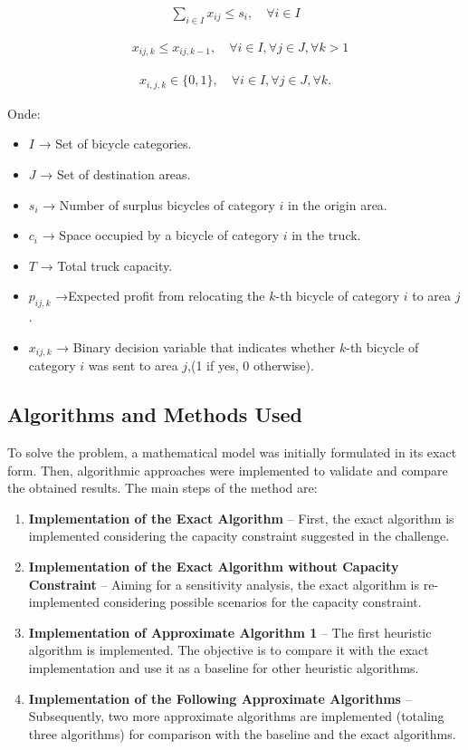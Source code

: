 \documentclass[]{article}
\begin{document}
\begin{align}
	\sum_{i \in I} x_{ij} \leq s_i, \quad \forall i \in I
\end{align}

\begin{align}
    & x_{ij,k} \leq x_{ij,k-1}, \quad \forall i \in I, \forall j \in J, \forall k > 1
\end{align}

\begin{align}
	x_{i,j,k} \in \{0, 1\}, \quad \forall i \in I, \forall j \in J, \forall k.
\end{align}

Onde:

\begin{itemize}
	\item $I$ → Set of bicycle categories.
	\item $J$ → Set of destination areas.
	\item $s_i$ → Number of surplus bicycles of category $i$ in the origin area.
	\item $c_i$ → Space occupied by a bicycle of category $i$ in the truck.
	\item $T$ → Total truck capacity.
	\item $p_{ij,k}$ →Expected profit from relocating the $k$-th bicycle of category $i$ to area $j$.
	\item $x_{ij,k}$ → Binary decision variable that indicates whether $k$-th bicycle of category $i$ was sent to area $j$,(1 if yes, 0 otherwise).
\end{itemize}

\subsection{Algorithms and Methods Used}

To solve the problem, a mathematical model was initially formulated in its exact form. Then, algorithmic approaches were implemented to validate and compare the obtained results. The main steps of the method are:

\begin{enumerate}
	\item \textbf{Implementation of the Exact Algorithm} – First, the exact algorithm is implemented considering the capacity constraint suggested in the challenge.
	\item \textbf{Implementation of the Exact Algorithm without Capacity Constraint} – Aiming for a sensitivity analysis, the exact algorithm is re-implemented considering possible scenarios for the capacity constraint.
	\item \textbf{Implementation of Approximate Algorithm 1} – The first heuristic algorithm is implemented. The objective is to compare it with the exact implementation and use it as a baseline for other heuristic algorithms.
	\item \textbf{Implementation of the Following Approximate Algorithms} – Subsequently, two more approximate algorithms are implemented (totaling three algorithms) for comparison with the baseline and the exact algorithms.
\end{enumerate}
\end{document}
